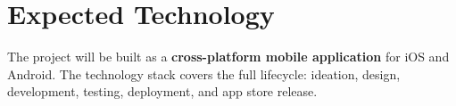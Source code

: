 \documentclass{article}
\begin{document}
\section{Expected Technology}






The project will be built as a \textbf{cross-platform mobile application} for iOS and Android. The technology stack covers the full lifecycle: ideation, design, development, testing, deployment, and app store release.
\end{document}

